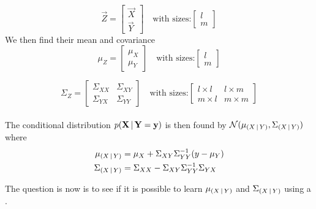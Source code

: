 \begin{equation}
\vec{Z} = 
\begin{bmatrix}
\vec{X} \\
\vec{Y}
\end{bmatrix}
\quad
\text{with sizes:} 
\begin{bmatrix}
l \\
m
\end{bmatrix}
\end{equation}
We then find their mean and covariance
\begin{equation}
\mu_{Z} = 
\begin{bmatrix}
\mu_{X} \\
\mu_{Y}
\end{bmatrix}
\quad
\text{with sizes:} 
\begin{bmatrix}
l \\
m
\end{bmatrix}
\end{equation}

\begin{equation}
\Sigma_{Z} = 
\begin{bmatrix}
\Sigma_{XX} & \Sigma_{XY} \\
\Sigma_{YX} & \Sigma_{YY}
\end{bmatrix}
\quad
\text{with sizes:} 
\begin{bmatrix}
l\times l & l \times m\\
m \times l & m \times m
\end{bmatrix}
\end{equation}
\\
The conditional distribution $p\given{\mathbf{X}}{\mathbf{Y}=\mathbf{y}}$ is then found by $\mathcal{N} (\mu_{\given{X}{Y}}, \Sigma_{\given{X}{Y}})$ where
\begin{align}
\mu_{\given{X}{Y}} &= \mu_{X} + \Sigma_{XY}\Sigma_{YY}^{-1}(y - \mu_{Y})
\label{eq_cond_mean}
\\
\Sigma_{\given{X}{Y}} &= \Sigma_{XX} - \Sigma_{XY}\Sigma_{YY}^{-1}\Sigma_{YX}
\label{eq_cond_var}
\end{align}

The question is now is to see if it is possible to learn $\mu_{\given{X}{Y}}$ and $\Sigma_{\given{X}{Y}}$ using a \cvae{}.

